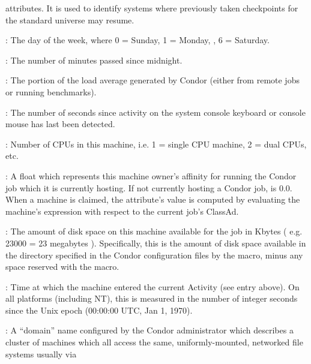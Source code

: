 \begin{description}
attributes.
It is used to identify systems where previously taken checkpoints for
the standard universe may resume.
%
\item[\AdAttr{ClockDay}] : The day of the week, where 0 = Sunday, 1 = Monday, \Dots, 6 = Saturday. 
%
\item[\AdAttr{ClockMin}] : The number of minutes passed since midnight.
%
\item[\AdAttr{CondorLoadAvg}] : The portion of the load average generated by Condor (either
from remote jobs or running benchmarks).
%
\item[\AdAttr{ConsoleIdle}] : The number of seconds since activity on the system
console keyboard or console mouse has last been detected.
%
\item[\AdAttr{Cpus}] : Number of CPUs in this machine, i.e. 1 = single CPU machine, 2 = dual
CPUs, etc.
%
\item[\AdAttr{CurrentRank}] : A float which represents this machine
owner's affinity
for running the Condor job which it is currently hosting.  If not
currently hosting a Condor job,  is 0.0.
When a machine is claimed,
the attribute's value is computed by evaluating the machine's
 expression with respect to the current job's ClassAd.
%
\item[\AdAttr{Disk}] : The amount of disk space on this machine available for
the job in Kbytes ( e.g. 23000 = 23 megabytes ).  Specifically, this
is the amount of disk space available in the directory specified in
the Condor configuration files by the  macro, minus any
space reserved with the  macro.
%
\item[\AdAttr{EnteredCurrentActivity}] : Time at which the machine
entered the current Activity (see  entry above).  On
all platforms (including NT), this is measured in the number of
integer seconds since the Unix epoch (00:00:00 UTC, Jan 1, 1970).
%
\item[\AdAttr{FileSystemDomain}] : A ``domain'' name configured by the
Condor administrator which describes a cluster of machines which all
access the same, uniformly-mounted, networked file systems usually via

\end{description}

